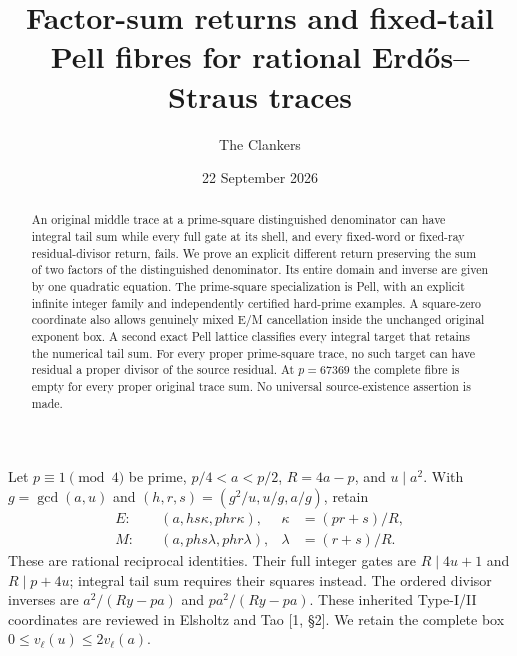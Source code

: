 \documentclass[10pt,reqno]{amsart}
\title{Factor-sum returns and fixed-tail Pell fibres for rational Erd\H{o}s--Straus traces}
\author{The Clankers}\date{22 September 2026}
\begin{document}
\begin{abstract}
An original middle trace at a prime-square distinguished denominator can have
integral tail sum while every full gate at its shell, and every fixed-word or
fixed-ray residual-divisor return, fails. We prove an explicit different
return preserving the sum of two factors of the distinguished denominator.
Its entire domain and inverse are given by one quadratic equation. The
prime-square specialization is Pell, with an explicit infinite integer family
and independently certified hard-prime examples. A square-zero coordinate also
allows genuinely mixed E/M cancellation inside the unchanged original exponent
box. A second exact Pell lattice classifies every integral target that retains
the numerical tail sum. For every proper prime-square trace, no such target
can have residual a proper divisor of the source residual. At $p=67369$ the
complete fibre is empty for every proper original trace sum. No universal
source-existence assertion is made.
\end{abstract}\maketitle

Let $p\equiv1\pmod4$ be prime, $p/4<a<p/2$, $R=4a-p$, and $u\mid a^2$.
With $g=\gcd(a,u)$ and $(h,r,s)=(g^2/u,u/g,a/g)$, retain
\begin{align*}
 E:&\quad(a,hs\kappa,phr\kappa),&\kappa&=(pr+s)/R,\\
 M:&\quad(a,phs\lambda,phr\lambda),&\lambda&=(r+s)/R.
\end{align*}
These are rational reciprocal identities. Their full integer gates are
$R\mid4u+1$ and $R\mid p+4u$; integral tail sum requires their squares
instead. The ordered divisor inverses are $a^2/(Ry-pa)$ and $pa^2/(Ry-pa)$.
These inherited Type-I/II coordinates are reviewed in Elsholtz and Tao [1,
\S2]. We retain the complete box $0\le v_\ell(u)\le2v_\ell(a)$.
\end{document}
